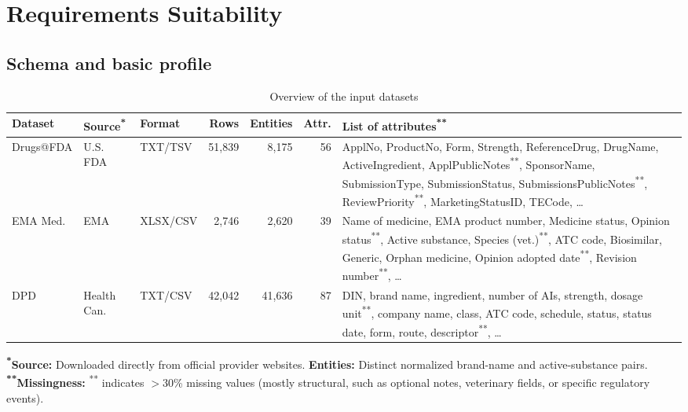 \documentclass[a4paper,oneside]{scrbook}
\newcommand{\miss}[1]{#1\textsuperscript{\textcolor{Missing}{**}}}
\begin{document}
\section{Requirements Suitability}

\subsection{Schema and basic profile}

\begin{table}[htbp]
\centering
\caption{Overview of the input datasets}
\label{tab:datasets}
\scriptsize
\setlength{\tabcolsep}{3.5pt}
\renewcommand{\arraystretch}{1.15}
\begin{tabularx}{\textwidth}{|l|l|l|r|r|r|>{\raggedright\arraybackslash}X|}
\hline
\textbf{Dataset} & \textbf{Source\textsuperscript{*}} & \textbf{Format} & \textbf{Rows} & \textbf{Entities} & \textbf{Attr.} & \textbf{List of attributes\textsuperscript{**}} \\
\hline
Drugs@FDA & U.S. FDA & TXT/TSV & 51,839 & 8,175 & 56 & ApplNo, ProductNo, Form, Strength, ReferenceDrug, DrugName, ActiveIngredient, \miss{ApplPublicNotes}, SponsorName, SubmissionType, SubmissionStatus, \miss{SubmissionsPublicNotes}, \miss{ReviewPriority}, MarketingStatusID, TECode, \dots \\
\hline
EMA Med. & EMA & XLSX/CSV & 2,746 & 2,620 & 39 & Name of medicine, EMA product number, Medicine status, \miss{Opinion status}, Active substance, \miss{Species (vet.)}, ATC code, Biosimilar, Generic, Orphan medicine, \miss{Opinion adopted date}, \miss{Revision number}, \dots \\
\hline
DPD & Health Can. & TXT/CSV & 42,042 & 41,636 & 87 & DIN, brand name, ingredient, number of AIs, strength, \miss{dosage unit}, company name, class, ATC code, schedule, status, status date, form, route, \miss{descriptor}, \dots \\
\hline
\end{tabularx}
\vspace{2pt}
\raggedright
{\scriptsize
\textbf{\textsuperscript{*}Source:} Downloaded directly from official provider websites. \textbf{Entities:} Distinct normalized brand-name and active-substance pairs. \\
\textbf{\textsuperscript{**}Missingness:} \textsuperscript{\textcolor{Missing}{**}} indicates $>$30\% missing values (mostly structural, such as optional notes, veterinary fields, or specific regulatory events).
}
\end{table}
\end{document}
